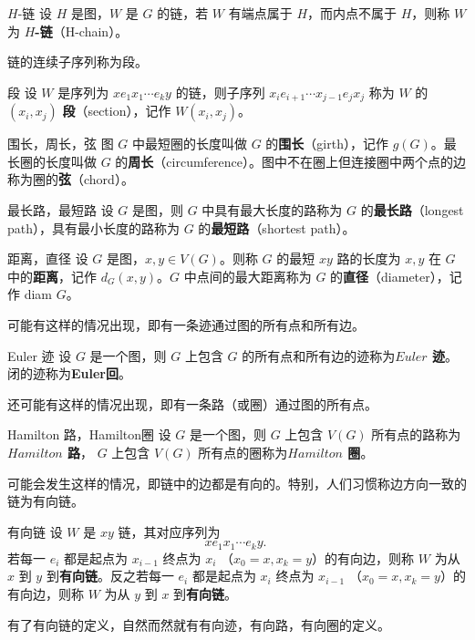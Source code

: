 \begin{definition}{$H$-链}
设 $H$ 是图，$W$ 是 $G$ 的链，若 $W$ 有端点属于 $H$，而内点不属于 $H$，则称 $W$ 为 \textbf{$H$-链}（H-chain）。 
\end{definition}
链的连续子序列称为段。
\begin{definition}{段}
设 $W$ 是序列为 $xe_1x_1\cdots e_ky$ 的链，则子序列 $x_ie_{i+1}\cdots x_{j-1}e_{j}x_j$ 称为 $W$ 的 $(x_i,x_j)$ \textbf{段}（section），记作 $W(x_i,x_j)$。
\end{definition}

\begin{definition}{围长，周长，弦}
图 $G$ 中最短圈的长度叫做 $G$ 的\textbf{围长}（girth），记作 $g(G)$。最长圈的长度叫做 $G$ 的\textbf{周长}（circumference）。图中不在圈上但连接圈中两个点的边称为圈的\textbf{弦}（chord）。
\end{definition}


\begin{definition}{最长路，最短路}
设 $G$ 是图，则 $G$ 中具有最大长度的路称为 $G$ 的\textbf{最长路}（longest path），具有最小长度的路称为 $G$ 的\textbf{最短路}（shortest path）。
\end{definition}

\begin{definition}{距离，直径}
设 $G$ 是图，$x,y\in V(G)$。则称 $G$ 的最短 $xy$ 路的长度为 $x,y$ 在 $G$ 中的\textbf{距离}，记作 $d_G(x,y)$。$G$ 中点间的最大距离称为 $G$ 的\textbf{直径}（diameter），记作 diam $G$。
\end{definition}

可能有这样的情况出现，即有一条迹通过图的所有点和所有边。
\begin{definition}{Euler 迹}
设 $G$ 是一个图，则 $G$ 上包含 $G$ 的所有点和所有边的迹称为\textbf{$Euler$ 迹}。闭的迹称为\textbf{Euler回}。
\end{definition}


还可能有这样的情况出现，即有一条路（或圈）通过图的所有点。
\begin{definition}{Hamilton 路，Hamilton圈}
设 $G$ 是一个图，则 $G$ 上包含 $V(G)$ 所有点的路称为\textbf{$Hamilton$ 路}， $G$ 上包含 $V(G)$ 所有点的圈称为\textbf{$Hamilton$ 圈}。
\end{definition}



可能会发生这样的情况，即链中的边都是有向的。特别，人们习惯称边方向一致的链为有向链。
\begin{definition}{有向链}
设 $W$ 是 $xy$ 链，其对应序列为
\begin{equation}
xe_1x_1\cdots e_ky.~
\end{equation}
若每一 $e_i$ 都是起点为 $x_{i-1}$ 终点为 $x_i$ （$x_0=x,x_k=y$）的有向边，则称 $W$ 为从 $x$ 到 $y$ 到\textbf{有向链}。反之若每一 $e_i$ 都是起点为 $x_{i}$ 终点为 $x_{i-1}$ （$x_0=x,x_k=y$）的有向边，则称 $W$ 为从 $y$ 到 $x$ 到\textbf{有向链}。
\end{definition}
有了有向链的定义，自然而然就有有向迹，有向路，有向圈的定义。

